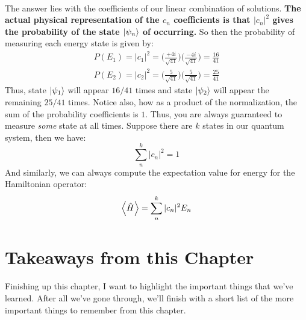 \documentclass[12pt,letterpaper]{book}
\begin{document}
\paragraph*{}The answer lies with the coefficients of our linear combination of solutions. \textbf{The actual physical representation of the $c_n$ coefficients is that $|c_n|^2$ gives the probability of the state $\ket{\psi_n}$ of occurring.} So then the probability of measuring each energy state is given by:
\begin{equation}
\begin{split}
P(E_1) = |c_1|^2 = \Big(\frac{+4i}{\sqrt{41}}\Big) \Big(\frac{-4i}{\sqrt{41}}\Big) = \frac{16}{41} \\
P(E_2) = |c_2|^2 = \Big(\frac{5}{\sqrt{41}}\Big) \Big(\frac{5}{\sqrt{41}}\Big) = \frac{25}{41}
\end{split}
\end{equation}
Thus, state $\ket{\psi_1}$ will appear $16/41$ times and state $\ket{\psi_2}$ will appear the remaining $25/41$ times. Notice also, how as a product of the normalization, the sum of the probability coefficients is $1$. Thus, you are always guaranteed to measure \textit{some} state at all times. Suppose there are $k$ states in our quantum system, then we have:
\begin{equation}
\sum_n^k |c_n|^2 = 1
\end{equation}
And similarly, we can always compute the expectation value for energy for the Hamiltonian operator:
\begin{equation}
\label{expect Hamiltionian}
\expval{\hat{H}} = \sum_n^k |c_n|^2 E_n
\end{equation}


\section{Takeaways from this Chapter}
\paragraph*{}Finishing up this chapter, I want to highlight the important things that we've learned. After all we've gone through, we'll finish with a short list of the more important things to remember from this chapter.

\end{document}
